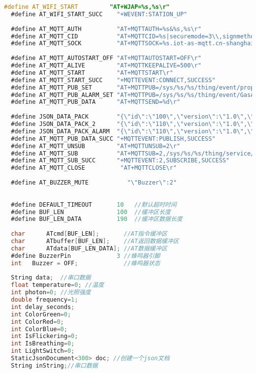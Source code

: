 \documentclass[12pt,hyperref,a4paper,UTF8]{ctexart}
\begin{document}
\begin{lstlisting}[language=C]
  #define AT_WIFI_START         "AT+WJAP=%s,%s\r"
  #define AT_WIFI_START_SUCC    "+WEVENT:STATION_UP"
  
  #define AT_MQTT_AUTH          "AT+MQTTAUTH=%s&%s,%s\r"
  #define AT_MQTT_CID           "AT+MQTTCID=%s|securemode=3\\,signmethod=hmacsha1\\,timestamp=%s|\r"
  #define AT_MQTT_SOCK          "AT+MQTTSOCK=%s.iot-as-mqtt.cn-shanghai.aliyuncs.com,1883\r"
  
  #define AT_MQTT_AUTOSTART_OFF "AT+MQTTAUTOSTART=OFF\r"
  #define AT_MQTT_ALIVE         "AT+MQTTKEEPALIVE=500\r"
  #define AT_MQTT_START         "AT+MQTTSTART\r"
  #define AT_MQTT_START_SUCC    "+MQTTEVENT:CONNECT,SUCCESS"
  #define AT_MQTT_PUB_SET       "AT+MQTTPUB=/sys/%s/%s/thing/event/property/post,1\r"
  #define AT_MQTT_PUB_ALARM_SET "AT+MQTTPUB=/sys/%s/%s/thing/event/GasAlarm/post,1\r"
  #define AT_MQTT_PUB_DATA      "AT+MQTTSEND=%d\r"
  
  #define JSON_DATA_PACK        "{\"id\":\"100\",\"version\":\"1.0\",\"method\":\"thing.event.property.post\",\"params\":{\"RoomTemp\":%d.%02d,\"AC\":%d,\"Fan\":%d,\"Buzzer\":%d,\"GasDetector\":%d}}\r"
  #define JSON_DATA_PACK_2      "{\"id\":\"110\",\"version\":\"1.0\",\"method\":\"thing.event.property.post\",\"params\":{\"LightDetector\":%d,\"Curtain\":%d,\"Light\":%d,\"SoilHumi\":%d,\"Pump\":%d,\"eCO2\":%d,\"TVOC\":%d}}\r"
  #define JSON_DATA_PACK_ALARM  "{\"id\":\"110\",\"version\":\"1.0\",\"method\":\"thing.event.GasAlarm.post\",\"params\":{\"GasDetector\":%d}}\r"
  #define AT_MQTT_PUB_DATA_SUCC "+MQTTEVENT:PUBLISH,SUCCESS"
  #define AT_MQTT_UNSUB         "AT+MQTTUNSUB=2\r"
  #define AT_MQTT_SUB           "AT+MQTTSUB=2,/sys/%s/%s/thing/service/property/set,1\r"
  #define AT_MQTT_SUB_SUCC      "+MQTTEVENT:2,SUBSCRIBE,SUCCESS"
  #define AT_MQTT_CLOSE          "AT+MQTTCLOSE\r"
  
  #define AT_BUZZER_MUTE           "\"Buzzer\":2"
  
  
  #define DEFAULT_TIMEOUT       10   //默认超时时间
  #define BUF_LEN               100  //缓冲区长度
  #define BUF_LEN_DATA          190  //缓冲区数据长度
  
  char      ATcmd[BUF_LEN];       //AT指令缓冲区
  char      ATbuffer[BUF_LEN];    //AT返回数据缓冲区
  char      ATdata[BUF_LEN_DATA]; //AT数据缓冲区
  #define BuzzerPin             3 //蜂鸣器引脚
  int   Buzzer = OFF;             //蜂鸣器状态
  
  String data;  //串口数据
  float temperature=0; //温度
  int photon=0; //光照强度
  double frequency=1; 
  int delay_seconds;
  int ColorGreen=0;
  int ColorRed=0; 
  int ColorBlue=0; 
  int IsFlickering=0;
  int IsBreathing=0;
  int LightSwitch=0;
  StaticJsonDocument<300> doc; //创建一个json文档
  String inString;//串口数据
  

\end{lstlisting}
\end{document}
